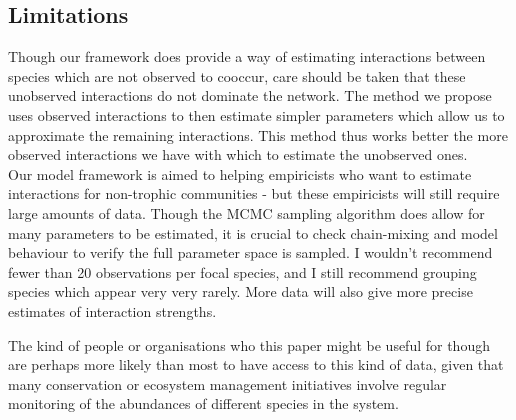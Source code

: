 \documentclass[a4,12pt]{article}
\begin{document}



    \subsection{Limitations}
        
        Though our framework does provide a way of estimating interactions between species which are not observed to cooccur, care should be taken that these unobserved interactions do not dominate the network. The method we propose uses observed interactions to then estimate simpler parameters which allow us to approximate the remaining interactions. This method thus works better the more observed interactions we have with which to estimate the unobserved ones. \\

        Our model framework is aimed to helping empiricists who want to estimate interactions for non-trophic communities - but these empiricists will still require large amounts of data. Though the MCMC sampling algorithm does allow for many parameters to be estimated, it is crucial to check chain-mixing and model behaviour to verify the full parameter space is sampled. I wouldn't recommend fewer than 20 observations per focal species, and I still recommend grouping species which appear very very rarely. More data will also give more precise estimates of interaction strengths. 

        The kind of people or organisations who this paper might be useful for though are perhaps more likely than most to have access to this kind of data, given that many conservation or ecosystem management initiatives involve regular monitoring of the abundances of different species in the system. 
\end{document}

